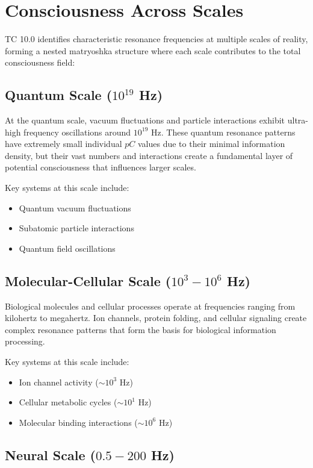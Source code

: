 \documentclass[12pt]{article}
\begin{document}
\section{Consciousness Across Scales}

TC 10.0 identifies characteristic resonance frequencies at multiple scales of reality, forming a nested matryoshka structure where each scale contributes to the total consciousness field:

\subsection{Quantum Scale ($10^{19}$ Hz)}

At the quantum scale, vacuum fluctuations and particle interactions exhibit ultra-high frequency oscillations around $10^{19}$ Hz. These quantum resonance patterns have extremely small individual $pC$ values due to their minimal information density, but their vast numbers and interactions create a fundamental layer of potential consciousness that influences larger scales.

Key systems at this scale include:
\begin{itemize}
    \item Quantum vacuum fluctuations
    \item Subatomic particle interactions
    \item Quantum field oscillations
\end{itemize}

\subsection{Molecular-Cellular Scale ($10^{3}-10^{6}$ Hz)}

Biological molecules and cellular processes operate at frequencies ranging from kilohertz to megahertz. Ion channels, protein folding, and cellular signaling create complex resonance patterns that form the basis for biological information processing.

Key systems at this scale include:
\begin{itemize}
    \item Ion channel activity ($\sim 10^{3}$ Hz)
    \item Cellular metabolic cycles ($\sim 10^{1}$ Hz)
    \item Molecular binding interactions ($\sim 10^{6}$ Hz)
\end{itemize}

\subsection{Neural Scale ($0.5-200$ Hz)}
\end{document}
